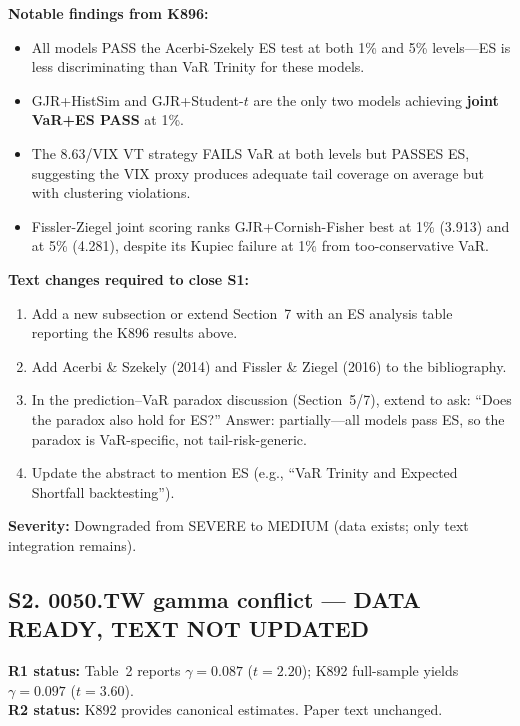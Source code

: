 \documentclass[12pt,a4paper]{article}
\begin{document}
\noindent\textbf{Notable findings from K896:}
\begin{itemize}[nosep]
\item All models PASS the Acerbi-Szekely ES test at both 1\% and 5\% levels---ES is less discriminating than VaR Trinity for these models.
\item GJR+HistSim and GJR+Student-$t$ are the only two models achieving \textbf{joint VaR+ES PASS} at 1\%.
\item The 8.63/VIX VT strategy FAILS VaR at both levels but PASSES ES, suggesting the VIX proxy produces adequate tail coverage on average but with clustering violations.
\item Fissler-Ziegel joint scoring ranks GJR+Cornish-Fisher best at 1\% (3.913) and at 5\% (4.281), despite its Kupiec failure at 1\% from too-conservative VaR.
\end{itemize}

\noindent\textbf{Text changes required to close S1:}
\begin{enumerate}[nosep]
\item Add a new subsection or extend Section~7 with an ES analysis table reporting the K896 results above.
\item Add Acerbi \& Szekely (2014) and Fissler \& Ziegel (2016) to the bibliography.
\item In the prediction--VaR paradox discussion (Section~5/7), extend to ask: ``Does the paradox also hold for ES?'' Answer: partially---all models pass ES, so the paradox is VaR-specific, not tail-risk-generic.
\item Update the abstract to mention ES (e.g., ``VaR Trinity and Expected Shortfall backtesting'').
\end{enumerate}

\textbf{Severity:} \textcolor{fixedblue}{Downgraded from SEVERE to MEDIUM} (data exists; only text integration remains).

\bigskip

\subsection*{\textcolor{fixedblue}{S2. 0050.TW gamma conflict --- DATA READY, TEXT NOT UPDATED}}

\textbf{R1 status:} Table~2 reports $\gamma = 0.087$ ($t = 2.20$); K892 full-sample yields $\gamma = 0.097$ ($t = 3.60$).\\
\textbf{R2 status:} K892 provides canonical estimates. Paper text unchanged.
\end{document}
